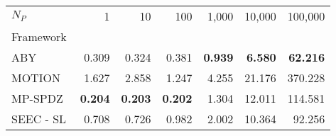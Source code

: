 \begin{tabular}{lrrrrrr}
\toprule
$N_P$ & 1 & 10 & 100 & 1,000 & 10,000 & 100,000 \\
Framework &  &  &  &  &  &  \\
\midrule
ABY~\cite{DSZ15} & 0.309 & 0.324 & 0.381 & \bfseries 0.939 & \bfseries 6.580 & \bfseries 62.216 \\
MOTION~\cite{BDST22} & 1.627 & 2.858 & 1.247 & 4.255 & 21.176 & 370.228 \\
MP-SPDZ~\cite{CCS:Keller20} & \bfseries 0.204 & \bfseries 0.203 & \bfseries 0.202 & 1.304 & 12.011 & 114.581 \\
SEEC - SL & 0.708 & 0.726 & 0.982 & 2.002 & 10.364 & 92.256 \\
\bottomrule
\end{tabular}
